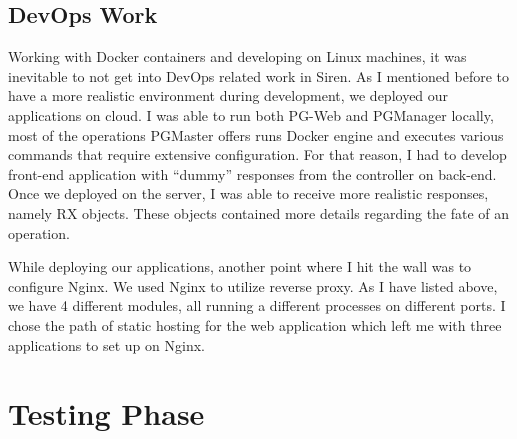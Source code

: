 \subsection{DevOps Work}
Working with Docker containers and developing on Linux machines, it was 
inevitable to not get into DevOps related work in Siren. As I mentioned before 
to have a more realistic environment during development, we deployed our 
applications on cloud. I was able to run both PG-Web and PGManager locally, 
most of the operations PGMaster offers runs Docker engine and executes 
various commands that require extensive configuration. For that reason, I 
had to develop front-end application with ``dummy'' responses from the 
controller on back-end. Once we deployed on the server, I was able to receive 
more realistic responses, namely RX objects. These objects contained more 
details regarding the fate of an operation.
\par
While deploying our applications, another point where I hit the wall was 
to configure Nginx. We used Nginx to utilize reverse proxy. As I have listed 
above, we have 4 different modules, all running a different processes on 
different ports. I chose the path of static hosting for the web application 
which left me with three applications to set up on Nginx.
\section{Testing Phase}